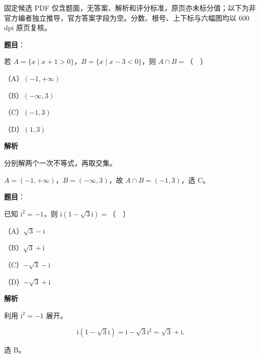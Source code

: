 

\begin{gktip}
固定候选 PDF 仅含题面，无答案、解析和评分标准，原页亦未标分值；以下为非官方编者独立推导，官方答案字段为空。分数、根号、上下标与六幅图均以 600 dpi 原页复核。
\end{gktip}

\begin{answer}

\textbf{题目}：

若 $A=\{x\mid x+1>0\}$，$B=\{x\mid x-3<0\}$，则 $A\cap B=$（　）

（A）$(-1,+\infty)$

（B）$(-\infty,3)$

（C）$(-1,3)$

（D）$(1,3)$

\textbf{解析}

分别解两个一次不等式，再取交集。

$A=(-1,+\infty)$，$B=(-\infty,3)$，故 $A\cap B=(-1,3)$，选 C。


\end{answer}
\begin{answer}

\textbf{题目}：

已知 $\mathrm i^2=-1$，则 $\mathrm i(1-\sqrt3\mathrm i)=$（　）

（A）$\sqrt3-\mathrm i$

（B）$\sqrt3+\mathrm i$

（C）$-\sqrt3-\mathrm i$

（D）$-\sqrt3+\mathrm i$

\textbf{解析}

利用 $\mathrm i^2=-1$ 展开。

\nopagebreak[4]
\[\mathrm i(1-\sqrt3\mathrm i)=\mathrm i-\sqrt3\mathrm i^2=\sqrt3+\mathrm i.\]

选 B。


\end{answer}
